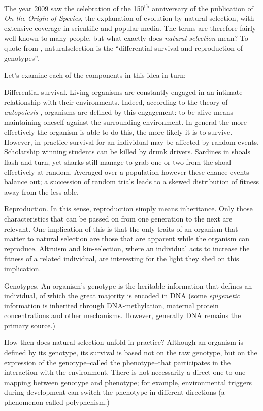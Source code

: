 The year 2009 saw the celebration of the 150\textsuperscript{th} anniversary of the publication of \emph{On the Origin of Species}, the explanation of evolution by natural selection, with extensive coverage in scientific and popular media. The terms are therefore fairly well known to many people, but what exactly does \emph{natural selection} mean? To quote from \parencite{Futuyama:1979tg}, \gls{naturalselection} is the ``differential survival and reproduction of genotypes''.

Let's examine each of the components in this idea in turn:

Differential survival. Living organisms are constantly engaged in an intimate relationship with their environments. Indeed, according to the theory of \emph{autopoiesis} \parencite{Varela:1974qd}, organisms are defined by this engagement: to be alive means maintaining oneself against the surrounding environment. In general the more effectively the organism is able to do this, the more likely it is to survive. However, in practice survival for an individual may be affected by random events. Scholarship winning students can be killed by drunk drivers. Sardines in shoals flash and turn, yet sharks still manage to grab one or two from the shoal effectively at random. Averaged over a population however these chance events balance out; a succession of random trials leads to a skewed distribution of fitness away from the less able.

Reproduction. In this sense, reproduction simply means inheritance. Only those characteristics that can be passed on from one generation to the next are relevant. One implication of this is that the only traits of an organism that matter to natural selection are those that are apparent while the organism can reproduce. Altruism and kin-selection, where an individual acts to increase the fitness of a related individual, are interesting for the light they shed on this implication.

Genotypes. An organism's \gls{genotype} is the heritable information that defines an individual, of which the great majority is encoded in DNA (some \emph{epigenetic} information is inherited through DNA-methylation, maternal protein concentrations and other mechanisms. However, generally DNA remains the primary source.)

How then does natural selection unfold in practice? Although an organism is defined by its genotype, its survival is based not on the raw genotype, but on the expression of the genotype--called the \gls{phenotype}--that participates in the interaction with the environment. There is not necessarily a direct one-to-one mapping between genotype and phenotype; for example, environmental triggers
during development can switch the phenotype in different directions (a phenomenon called \gls{polyphenism}.)

